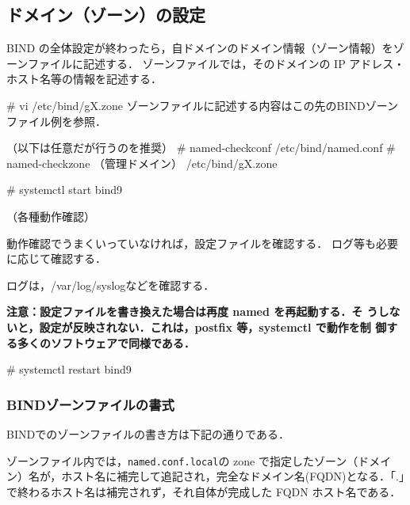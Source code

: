 \subsection{ドメイン（ゾーン）の設定}

BIND の全体設定が終わったら，自ドメインのドメイン情報（ゾーン情報）をゾーンファイルに記述する．
ゾーンファイルでは，そのドメインの IP アドレス・ホスト名等の情報を記述する．

\begin{cli}
# vi /etc/bind/gX.zone
ゾーンファイルに記述する内容はこの先のBINDゾーンファイル例を参照．

（以下は任意だが行うのを推奨）
# named-checkconf /etc/bind/named.conf
# named-checkzone （管理ドメイン） /etc/bind/gX.zone

# systemctl start bind9

（各種動作確認）

\end{cli}

動作確認でうまくいっていなければ，設定ファイルを確認する．
ログ等も必要に応じて確認する．

ログは，/var/log/syslogなどを確認する．

\textbf{注意：設定ファイルを書き換えた場合は再度 named を再起動する．そ
うしないと，設定が反映されない．これは，postfix 等，systemctl で動作を制
御する多くのソフトウェアで同様である．}

\begin{cli}
# systemctl restart bind9
\end{cli}

\subsubsection{BINDゾーンファイルの書式}

BINDでのゾーンファイルの書き方は下記の通りである．

ゾーンファイル内では，\texttt{named.conf.local}の zone で指定したゾーン（ドメイン）名が，ホスト名に補完して追記され，完全なドメイン名(FQDN)となる．「.」で終わるホスト名は補完されず，それ自体が完成した FQDN ホスト名である．

